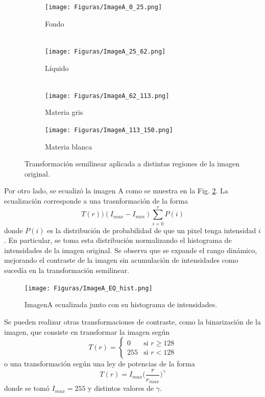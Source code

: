 \documentclass[11pt,twocolumn,twoside]{opticajnl}
\begin{document}
\begin{figure}[h]
    \centering
         \begin{subfigure}[h]{0.24\linewidth}
            \centering
            \texttt{[image: Figuras/ImageA\_0\_25.png]}
            \caption{Fondo \\
            $~$} 
         \end{subfigure}
         \begin{subfigure}[h]{0.24\linewidth}
            \centering
            \texttt{[image: Figuras/ImageA\_25\_62.png]}
            \caption{Líquido \\ 
            $~$} 
         \end{subfigure}
         \begin{subfigure}[h]{0.24\linewidth}
            \centering
            \texttt{[image: Figuras/ImageA\_62\_113.png]}
            \caption{Materia gris} 
         \end{subfigure}
         \begin{subfigure}[h]{0.24\linewidth}
            \centering
            \texttt{[image: Figuras/ImageA\_113\_150.png]}
            \caption{Materia blanca} 
         \end{subfigure}
    \caption{Transformación semilinear aplicada a distintas regiones de la imagen original.%
    }
    \label{fig:Semilineartrans_region}
\end{figure}

Por otro lado, se ecualizó la imagen A como se muestra en la Fig. \ref{fig:EQ}. La ecualización corresponde a una trasnformación de la forma
\begin{equation}
    T(r) ) (I_{max} - I_{min}) \sum_{i=0}^{r} P(i)
\end{equation}
donde $P(i)$ es la distribución de probabilidad de que un pixel tenga intensidad $i$. En particular, se toma esta distribución normalizando el histograma de intensidades de la imagen original. Se observa que se expande el rango dinámico, mejorando el contraste de la imagen sin acumulación de intensidades como sucedía en la transformación semilinear.

\begin{figure}[h]
    \centering
        \texttt{[image: Figuras/ImageA\_EQ\_hist.png]}
    \caption{ImagenA ecualizada junto con su histograma de intensidades.} 
    \label{fig:EQ}
\end{figure}

Se pueden realizar otras transformaciones de contraste, como la binarización de la imagen, que consiste en transformar la imagen según 
\begin{equation}
    T(r) = 
    \begin{cases}
    0 & \text{si } r \geq 128 \\
    255 & \text{si } r < 128
    \end{cases}
\end{equation}
o una transformación según una ley de potencias de la forma
\begin{equation}
    T(r) = I_{max} \biggr( \frac{r}{r_{max}}\biggr)^\gamma
\end{equation}
donde se tomó $I_{max} = 255$ y distintos valores de $\gamma$.
\end{document}
